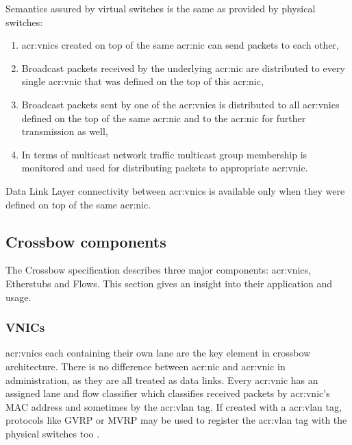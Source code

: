 \documentclass[11pt]{book}
\begin{document}
        Semantics assured by virtual switches is the same as provided by physical switches: 

        \begin{enumerate}
          \item \gls{acr:vnic}s created on top of the same \gls{acr:nic} can send packets to each other,
          \item Broadcast packets received by the underlying \gls{acr:nic} are distributed to every single \gls{acr:vnic} that was defined
                on the top of this \gls{acr:nic},
          \item Broadcast packets sent by one of the \gls{acr:vnic}s is distributed to all \gls{acr:vnic}s defined on the top of the same
                \gls{acr:nic} and to the \gls{acr:nic} for further transmission as well,
          \item In terms of multicast network traffic multicast group membership is monitored and used for distributing
                packets to appropriate \gls{acr:vnic}.
        \end{enumerate}

        Data Link Layer connectivity between \gls{acr:vnic}s is available only when they were defined on top of the same \gls{acr:nic}. 

	
      \subsection{Crossbow components}

        The Crossbow specification describes three major components: \gls{acr:vnic}s, Etherstubs and Flows. This section
        gives an insight into their application and usage.

                
        \subsubsection{VNICs}
        
          \gls{acr:vnic}s each containing their own lane are the key element in crossbow architecture. There is no
          difference between \gls{acr:nic} and \gls{acr:vnic} in administration, as they are all treated as data links.
          Every \gls{acr:vnic} has an assigned lane and flow classifier which classifies received packets by
          \gls{acr:vnic}'s MAC address and sometimes by the \gls{acr:vlan} tag.  If created with a \gls{acr:vlan} tag,
          protocols like GVRP or MVRP may be used to register the \gls{acr:vlan} tag with the physical switches too
          \cite{crossbow}.	
\end{document}
